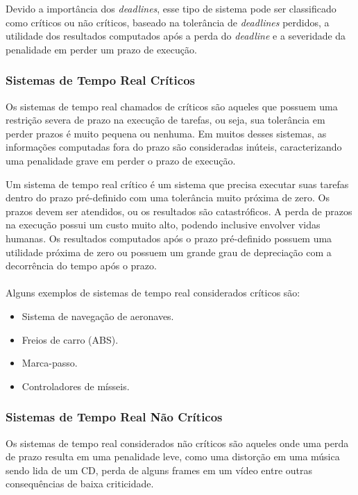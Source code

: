 Devido a importância dos \textit{deadlines}, esse tipo de sistema pode ser classificado como
críticos ou não críticos, baseado na tolerância de \textit{deadlines} perdidos, a utilidade
dos resultados computados após a perda do \textit{deadline} e a severidade da penalidade em
perder um prazo de execução.

\subsubsection{Sistemas de Tempo Real Críticos}
Os sistemas de tempo real chamados de críticos são aqueles que possuem uma restrição severa
de prazo na execução de tarefas, ou seja, sua tolerância em perder prazos é muito pequena
ou nenhuma. Em muitos desses sistemas, as informações computadas fora do prazo são consideradas
inúteis, caracterizando uma penalidade grave em perder o prazo de execução.

Um sistema de tempo real crítico é um sistema que precisa executar suas tarefas dentro do prazo
pré-definido com uma tolerância muito próxima de zero. Os prazos devem ser atendidos, ou os resultados
são catastróficos. A perda de prazos na execução possui um custo muito alto, podendo inclusive
envolver vidas humanas. Os resultados computados após o prazo pré-definido possuem uma utilidade próxima
de zero ou possuem um grande grau de depreciação com a decorrência do tempo após o prazo.~\cite{Li:2003:RCE:829584} \\\\
Alguns exemplos de sistemas de tempo real considerados críticos são:
\begin{itemize}
\item Sistema de navegação de aeronaves.
\item Freios de carro (ABS).
\item Marca-passo.
\item Controladores de mísseis.
\end{itemize}

\subsubsection{Sistemas de Tempo Real Não Críticos}
Os sistemas de tempo real considerados não críticos são aqueles onde uma perda de prazo
resulta em uma penalidade leve, como uma distorção em uma música sendo lida de um CD, perda
de alguns frames em um vídeo entre outras consequências de baixa criticidade.


